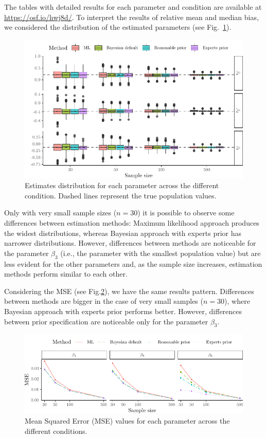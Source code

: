 \documentclass[graybox]{svmult}
\begin{document}
The tables with detailed results for each parameter and condition are available at \url{https://osf.io/hwj8d/}. To interpret the results of relative mean and median bias, we considered the distribution of the estimated parameters (see Fig.~\ref{fig:boxplots}).
\begin{figure}[t]
	\sidecaption
	\includegraphics[width = .8\textwidth]{figure/Plot_boxplots}
	\caption{Estimates distribution for each parameter across the different condition. Dashed lines represent the true population values.}
	\label{fig:boxplots}
\end{figure}
Only with very small sample sizes ($n=30$) it is possible to observe some differences between estimation methods: Maximum likelihood approach produces the widest distributions, whereas Bayesian approach with experts prior has narrower distributions. However, differences between methods are noticeable for the parameter $\beta_3$ (i.e., the parameter with the smallest population value) but are less evident for the other parameters and, as the sample size increases, estimation methods perform similar to each other.

Considering the MSE (see Fig.\ref{fig:mse}), we have the same results pattern. Differences between methods are bigger in the case of very small samples ($n=30$), where Bayesian approach with experts prior performs better. However, differences between prior specification are noticeable only for the parameter $\beta_3$.
\begin{figure}[t]
	\sidecaption
	\includegraphics[width = .8\textwidth]{figure/Plot_MSE}
	\caption{Mean Squared Error (MSE) values for each parameter across the different conditions.}
	\label{fig:mse}
\end{figure}
\end{document}
